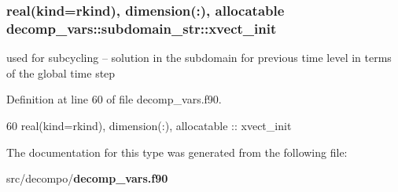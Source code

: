 \subsubsection[{xvect\+\_\+init}]{\setlength{\rightskip}{0pt plus 5cm}real(kind=rkind), dimension(\+:), allocatable decomp\+\_\+vars\+::subdomain\+\_\+str\+::xvect\+\_\+init}\label{structdecomp__vars_1_1subdomain__str_a913840d462bfa84447e8dbe7d41a4259}


used for subcycling -- solution in the subdomain for previous time level in terms of the global time step 



Definition at line 60 of file decomp\+\_\+vars.\+f90.


\begin{DoxyCode}
60     \textcolor{keywordtype}{real(kind=rkind)}, \textcolor{keywordtype}{dimension(:)}, \textcolor{keywordtype}{allocatable} :: xvect\_init
\end{DoxyCode}


The documentation for this type was generated from the following file\+:\begin{DoxyCompactItemize}
\item 
src/decompo/{\bf decomp\+\_\+vars.\+f90}\end{DoxyCompactItemize}
